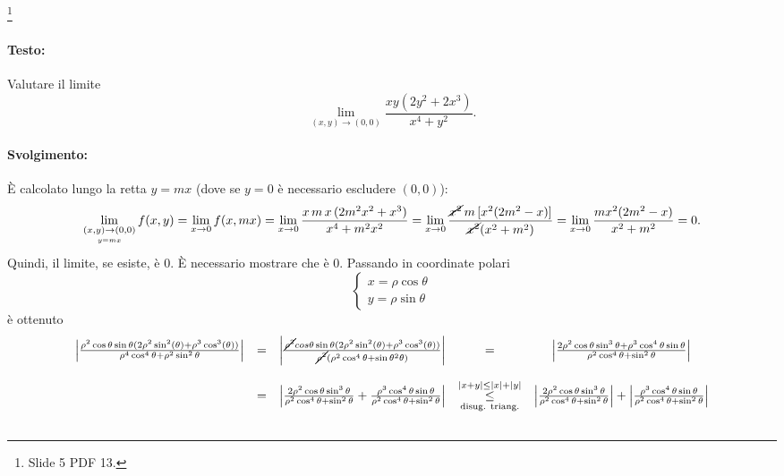 \begin{example}\footnote{Slide 5 PDF 13.}
	\paragraph{Testo:} Valutare il limite
	\begin{equation*}
		\lim_{(x,y)\rightarrow(0,0)} \frac{xy(2y^2 + 2 x^3)}{x^4+y^2}.
	\end{equation*}
	\paragraph{Svolgimento:} È calcolato lungo la retta $y=mx$ (dove se $y=0$ è necessario escludere $(0,0)$):
	\begin{equation*}
		\lim_{\underset{y=mx}{(x,y)\rightarrow (0,0)}} f(x,y)=\lim_{x\rightarrow 0}f(x,mx)=\lim_{x\rightarrow 0} \frac{x\,m\,x\,(2m^2x^2+x^3)}{x^4+m^2x^2}=\lim_{x\rightarrow 0}\frac{\cancel{x^2}\,m\, [x^2(2m^2-x)]}{\cancel{x^2}(x^2+m^2)} = \lim_{x\rightarrow 0}\frac{mx^2(2m^2-x)}{x^2+m^2}=0.
	\end{equation*}
	Quindi, il limite, se esiste, è 0. È necessario mostrare che è 0. Passando in coordinate polari
	\begin{equation*}
		\begin{cases}
			x=\rho\cos\theta\\
			y=\rho\sin\theta
		\end{cases}
	\end{equation*}
	è ottenuto
	\begin{equation*}
		\begin{matrix}
			\left|\frac{\rho^2\cos\theta \sin\theta (2\rho^2\sin^2(\theta)+\rho^3\cos^3(\theta))}{\rho^4\cos^4\theta + \rho^2 \sin^2\theta}\right| &=& \left|\frac{\cancel{\rho^2}cos\theta \sin\theta (2\rho^2\sin^2(\theta)+\rho^3\cos^3(\theta))}{\cancel{\rho^2}(\rho^2\cos^4\theta + \sin\theta^2\theta)}\right|&=& \left|\frac{2\rho^2\cos\theta\sin^3\theta + \rho^3 \cos^4\theta\sin\theta}{\rho^2 \cos^4\theta + \sin^2\theta}\right|\\\\
			&=& \left|\frac{2\rho^2\cos\theta\sin^3\theta}{\rho^2 \cos^4\theta + \sin^2\theta} + \frac{\rho^3 \cos^4\theta\sin\theta}{\rho^2 \cos^4\theta + \sin^2\theta}\right| &\overset{|x+y|\leq|x|+|y|}{\underset{\text{disug. triang.}}{\leq}}& \left|\frac{2\rho^2\cos\theta\sin^3\theta}{\rho^2 \cos^4\theta + \sin^2\theta}\right| + \left| \frac{\rho^3 \cos^4\theta\sin\theta}{\rho^2 \cos^4\theta + \sin^2\theta}\right|\\\\

\end{matrix}
\end{equation*}
\end{example}
